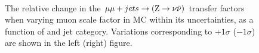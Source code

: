 \begin{figure}[!h]
  \centering
   ~~
  \\

  \caption{\label{fig:tfSyst_muon scale factor_mumuToZinv} The relative change in
  the $\mmj \rightarrow (\znunu)$ transfer
  factors when varying muon scale factor in MC within its uncertainties, as a function of \scalht and jet category. 
  Variations corresponding to $+1\sigma$ ($-1\sigma$) are shown in the left (right) figure. 
  }
\end{figure}

